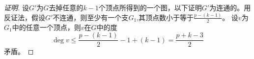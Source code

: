 \begin{proof}[证明]
  设$G'$为$G$去掉任意的$k-1$个顶点所得到的一个图，以下证明$G'$为连通的。用反证法，假设$G'$不连通，则至少有一个支$G_1$,其顶点数小于等于$\frac{p-(k-1)}{2}$。
  设$v$为$G_1$中的任意一个顶点，则$v$在$G$中的度
  \[\deg v \leq \frac{p-(k-1)}{2} - 1 + (k-1) = \frac{p+k-3}{2}\]
矛盾。
\end{proof}
